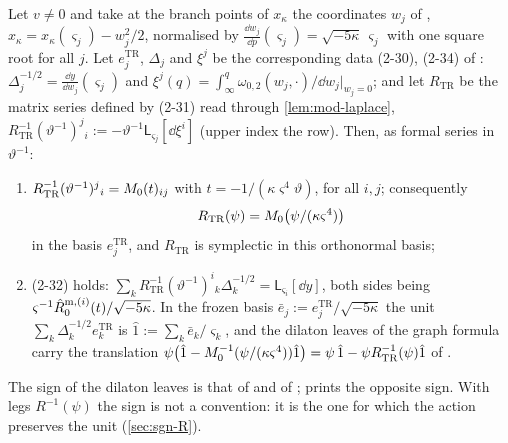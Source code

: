 \begin{prop}
\label{prop:mod-Rtr}
Let $v\neq 0$ and take at the branch points of $x_\kappa$ the coordinates $w_j$ of \cite[\S2.6]{Dunin-Barkowski:2015caa}, $x_\kappa=x_\kappa(\varsigma_j)-w_j^2/2$, normalised by $\frac{\dd w_j}{\dd p}(\varsigma_j)=\sqrt{-5\kappa}\,\varsigma_j$ with one square root for all $j$. Let $e^{\mathrm{TR}}_j$, $\Delta_j$ and $\xi^j$ be the corresponding data (2-30), (2-34) of \cite[\S2.6]{Dunin-Barkowski:2015caa}: $\Delta_j^{-1/2}=\frac{\dd y}{\dd w_j}(\varsigma_j)$ and $\xi^j(q)=\int_\infty^q\omega_{0,2}(w_j,\cdot)/\dd w_j|_{w_j=0}$; and let $R_{\mathrm{TR}}$ be the matrix series defined by (2-31) read through \cref{lem:mod-laplace}, $R_{\mathrm{TR}}^{-1}(\vartheta^{-1})^j{}_i:=-\vartheta^{-1}\mathsf L_{\varsigma_j}[\dd\xi^i]$ (upper index the row). Then, as formal series in $\vartheta^{-1}$:
\begin{enumerate}
\item $R_{\mathrm{TR}}^{-1}(\vartheta^{-1})^j{}_i=M_{0}(t)_{ij}$ with $t=-1/(\kappa\varsigma^4\vartheta)$, for all $i,j$; consequently
\begin{equation}
\label{eq:mod-Rtr}
R_{\mathrm{TR}}(\psi)=M_{0}\big(\psi/(\kappa\varsigma^4)\big)
\end{equation}
in the basis $e^{\mathrm{TR}}_j$, and $R_{\mathrm{TR}}$ is symplectic in this orthonormal basis;
\item (2-32) holds: $\sum_kR_{\mathrm{TR}}^{-1}(\vartheta^{-1})^i{}_k\Delta_k^{-1/2}=\mathsf L_{\varsigma_i}[\dd y]$, both sides being $\varsigma^{-1}\hat{R}^{\mathrm m,(i)}_0(t)/\sqrt{-5\kappa}$. In the frozen basis $\bar e_j:=e^{\mathrm{TR}}_j/\sqrt{-5\kappa}$ the unit $\sum_k\Delta_k^{-1/2}e^{\mathrm{TR}}_k$ is $\hat 1:=\sum_k\bar e_k/\varsigma_k$, and the dilaton leaves of the graph formula carry the translation $\psi\big(\hat 1-M_{0}^{-1}(\psi/(\kappa\varsigma^4))\hat 1\big)=\psi\,\hat 1-\psi R_{\mathrm{TR}}^{-1}(\psi)\hat 1$ of \cite[Def.~2.13]{PPZ15}.
\end{enumerate}
\end{prop}

The sign of the dilaton leaves is that of \cite[\S2.3]{DuninBarkowski:2012bw} and of \cite[Prop.~2.12, Def.~2.13]{PPZ15}; \cite[\S2.3]{Dunin-Barkowski:2015caa} prints the opposite sign. With legs $R^{-1}(\psi)$ the sign is not a convention: it is the one for which the action preserves the unit (\cref{sec:sgn-R}).


